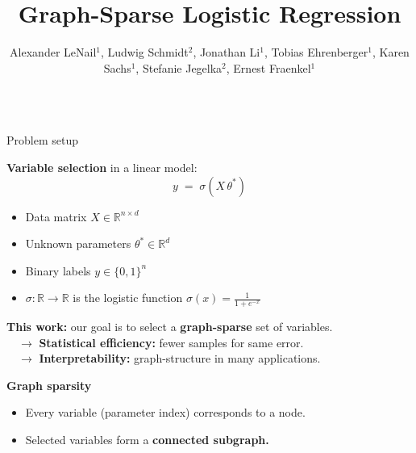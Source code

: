 \documentclass[svgnames,final]{beamer}
\title{Graph-Sparse Logistic Regression}
\author{Alexander LeNail$^1$, Ludwig Schmidt$^2$, Jonathan Li$^1$, Tobias Ehrenberger$^1$, Karen Sachs$^1$, Stefanie Jegelka$^2$, Ernest Fraenkel$^1$}
\institute{$^1$MIT BE, $^2$MIT CSAIL}
\newcommand{\R}{\ensuremath{\mathbb{R}}}
\newcommand{\thetastar}{\ensuremath{\theta^*}}
\begin{document}
\newlength{\gextlength}
\setlength{\gextlength}{14pt}
\newlength{\gselradius}
\setlength{\gselradius}{38pt}

\begin{frame}
\vspace{-.5cm}
\begin{columns}[T]

\begin{column}{.3\linewidth}

	\begin{block}{Problem setup}
		
    \vspace{-.8cm}

    \textbf{Variable selection} in a linear model:
    {\Large
    \[
      y \; = \; \sigma(X \,  \thetastar)
    \]
    }

    \vspace{-.7cm}

    \begin{itemize}
      \item Data matrix $X \in \R^{n \times d}$\\[.2cm]
      \item Unknown parameters $\thetastar \in \R^d$\\[.2cm]
      \item Binary labels $y \in \{0,1\}^n$\\[.2cm]
      \item $\sigma: \R \rightarrow \R$ is the logistic function $\sigma(x) = \frac{1}{1 + e^{-x}}$
    \end{itemize}

    \vspace{1.2cm}
    \textbf{This work:} our goal is to select a \textbf{graph-sparse} set of variables.\\[.5cm]
    $\quad\rightarrow$ \textbf{Statistical efficiency:} fewer samples for same error.\\[.3cm]
    $\quad\rightarrow$ \textbf{Interpretability:} graph-structure in many applications.

    \vspace{1.2cm}
    \textbf{Graph sparsity}
		\begin{itemize}
  		\item Every variable (parameter index) corresponds to a node.\\[.2cm]
			\item Selected variables form a \textbf{connected subgraph.}
    \end{itemize}


\end{block}
\end{column}
\end{columns}
\end{frame}
\end{document}
